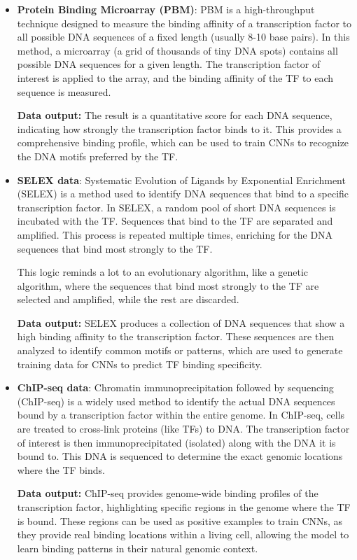 \documentclass[a4paper]{article}
\begin{document}
\begin{itemize}
    \item \textbf{Protein Binding Microarray (PBM)}: PBM is a high-throughput 
    technique designed to measure the binding affinity of a transcription 
    factor to all possible DNA sequences of a fixed length (usually 8-10 base 
    pairs). In this method, a microarray (a grid of thousands of tiny DNA 
    spots) contains all possible DNA sequences for a given length. The 
    transcription factor of interest is applied to the array, and the 
    binding affinity of the TF to each sequence is measured.

    \textbf{Data output:} The result is a quantitative score for each DNA 
    sequence, indicating how strongly the transcription factor binds to it. 
    This provides a comprehensive binding profile, which can be used to train
    CNNs to recognize the DNA motifs preferred by the TF.

    \item \textbf{SELEX data}: Systematic Evolution of Ligands by Exponential 
    Enrichment (SELEX) is a method used to identify DNA sequences that bind 
    to a specific transcription factor. In SELEX, a random pool of short DNA 
    sequences is incubated with the TF. Sequences that bind to the TF are 
    separated and amplified. This process is repeated multiple times, enriching 
    for the DNA sequences that bind most strongly to the TF.

    This logic reminds a lot to an evolutionary algorithm, like a genetic algorithm,
    where the sequences that bind most strongly to the TF are selected and
    amplified, while the rest are discarded.

    \textbf{Data output:} SELEX produces a collection of DNA sequences that 
    show a high binding affinity to the transcription factor. These sequences 
    are then analyzed to identify common motifs or patterns, which are used to 
    generate training data for CNNs to predict TF binding specificity.

    \item \textbf{ChIP-seq data}: Chromatin immunoprecipitation followed by 
    sequencing (ChIP-seq) is a widely used method to identify the actual DNA 
    sequences bound by a transcription factor within the entire genome. 
    In ChIP-seq, cells are treated to cross-link proteins (like TFs) to DNA. 
    The transcription factor of interest is then immunoprecipitated (isolated) 
    along with the DNA it is bound to. This DNA is sequenced to determine the 
    exact genomic locations where the TF binds.

    \textbf{Data output:} ChIP-seq provides genome-wide binding profiles of 
    the transcription factor, highlighting specific regions in the genome 
    where the TF is bound. These regions can be used as positive examples 
    to train CNNs, as they provide real binding locations within a living 
    cell, allowing the model to learn binding patterns in their natural 
    genomic context.

\end{itemize}
\end{document}
